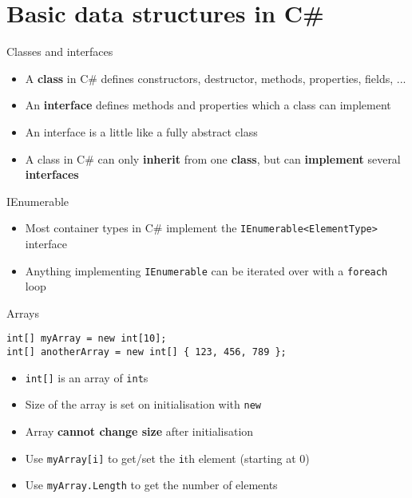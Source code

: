 \part{Basic data structures in C\#}
\frame{\partpage}

\begin{frame}{Classes and interfaces}
    \begin{itemize}
        \pause\item A \textbf{class} in C\# defines constructors, destructor, methods, properties, fields, ...
        \pause\item An \textbf{interface} defines methods and properties which a class can implement
        \pause\item An interface is a little like a fully abstract class
        \pause\item A class in C\# can only \textbf{inherit} from one \textbf{class},
            but can \textbf{implement} several \textbf{interfaces}
    \end{itemize}
\end{frame}

\begin{frame}{IEnumerable}
    \begin{itemize}
        \pause\item Most container types in C\# implement the \lstinline{IEnumerable<ElementType>} interface
        \pause\item Anything implementing \lstinline{IEnumerable} can be iterated over with a \lstinline{foreach} loop
    \end{itemize}
\end{frame}

\begin{frame}[fragile]{Arrays}
    \begin{lstlisting}
int[] myArray = new int[10];
int[] anotherArray = new int[] { 123, 456, 789 };
    \end{lstlisting}
    \begin{itemize}
        \pause\item \lstinline{int[]} is an array of \lstinline{int}s
        \pause\item Size of the array is set on initialisation with \lstinline{new}
        \pause\item Array \textbf{cannot change size} after initialisation
        \pause\item Use \lstinline{myArray[i]} to get/set the \lstinline{i}th element (starting at 0)
        \pause\item Use \lstinline{myArray.Length} to get the number of elements
    \end{itemize}
\end{frame}

